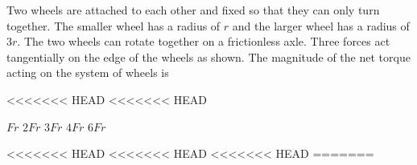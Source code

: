\documentclass{../../oss-apphys-exam}
\begin{document}
\begin{multicols*}{2}
\begin{questions}
    \question Two wheels are attached to each other and fixed so that they can
    only turn together. The smaller wheel has a radius of $r$ and the larger
    wheel has a radius of $3r$. The two wheels can rotate together on a
    frictionless axle. Three forces act tangentially on the edge of the wheels
    as shown. The magnitude of the net torque acting on the system of wheels is
    \begin{center}
<<<<<<< HEAD
<<<<<<< HEAD
    \end{center}
    \begin{choices}
      \choice $Fr$
      \choice $2Fr$
      \choice $3Fr$
      \choice $4Fr$
      \choice $6Fr$
    \end{choices}
<<<<<<< HEAD
<<<<<<< HEAD
<<<<<<< HEAD
=======



\end{questions}
\end{multicols*}
\end{document}
